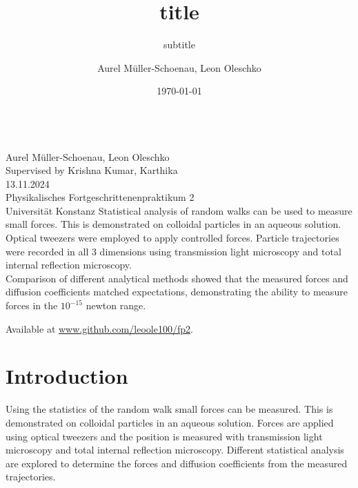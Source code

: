 \documentclass[
    twoside=false,
    twocolumn=true,
    fontsize=11pt,
]{scrarticle}
\begin{document}
\title{title}
\subtitle{subtitle}
\author{Aurel Müller-Schoenau, Leon Oleschko}
\date{\dotdate\today}


\begin{titlepage}
    \sffamily
    \vspace*{3cm}
    {
        \fontsize{32}{32}
    }
    \vspace{.25cm}\\
    {
        \Large
        Aurel Müller-Schoenau, Leon Oleschko\\
        Supervised by Krishna Kumar, Karthika
        \vspace{.05cm}\\
        13.11.2024
        \vspace{.25cm}\\
        \normalsize
        Physikalisches Fortgeschrittenenpraktikum 2\\
        Universität Konstanz
    }
    \vfill
    {
        \normalfont\normalsize
        Statistical analysis of random walks can be used to measure small forces.
        This is demonstrated on colloidal particles in an aqueous solution.
        Optical tweezers were employed to apply controlled forces.
        Particle trajectories were recorded in all 3 dimensions using transmission light microscopy and total internal reflection microscopy. \\
        Comparison of different analytical methods showed that the measured forces and diffusion coefficients matched expectations, demonstrating the ability to measure forces in the $10^{-15}$ newton range.
    }
    \vfill
    \begin{flushright}
        Available at \url{www.github.com/leoole100/fp2}.
    \end{flushright}
\end{titlepage}

\section{Introduction}
Using the statistics of the random walk small forces can be measured.
This is demonstrated on colloidal particles in an aqueous solution.
Forces are applied using optical tweezers and the position is measured with transmission light microscopy and total internal reflection microscopy.
Different statistical analysis are explored to determine the forces and diffusion coefficients from the measured trajectories.
\end{document}
